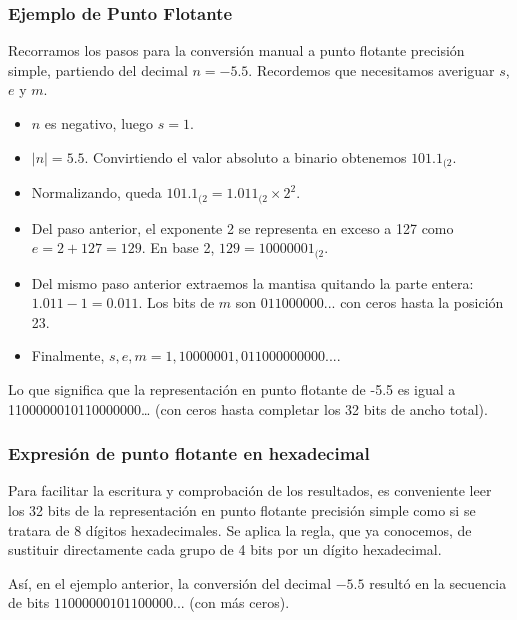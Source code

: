 \documentclass[spanish,a4paper,]{article}
\providecommand{\tightlist}{%
  \setlength{\itemsep}{0pt}\setlength{\parskip}{0pt}}
\begin{document}
\hypertarget{ejemplo-de-punto-flotante}{%
\subsubsection{Ejemplo de Punto
Flotante}\label{ejemplo-de-punto-flotante}}

Recorramos los pasos para la conversión manual a punto flotante
precisión simple, partiendo del decimal \(n = -5.5\). Recordemos que
necesitamos averiguar \(s\), \(e\) y \(m\).

\begin{itemize}
\tightlist
\item
  \(n\) es negativo, luego \(s = 1\).
\item
  \(|n| = 5.5\). Convirtiendo el valor absoluto a binario obtenemos
  \(101.1_{(2}\).
\item
  Normalizando, queda \(101.1_{(2} = 1.011_{(2}\times 2^2\).
\item
  Del paso anterior, el exponente 2 se representa en exceso a 127 como
  \(e = 2 + 127 = 129\). En base 2, \(129 = 10000001_{(2}\).
\item
  Del mismo paso anterior extraemos la mantisa quitando la parte entera:
  \(1.011 - 1 = 0.011\). Los bits de \(m\) son \(011000000...\) con
  ceros hasta la posición 23.
\item
  Finalmente, \(s, e, m = 1, 10000001, 011000000000...\).
\end{itemize}

Lo que significa que la representación en punto flotante de -5.5 es
igual a 1100000010110000000\ldots{} (con ceros hasta completar los 32
bits de ancho total).

\hypertarget{expresiuxf3n-de-punto-flotante-en-hexadecimal}{%
\subsubsection{Expresión de punto flotante en
hexadecimal}\label{expresiuxf3n-de-punto-flotante-en-hexadecimal}}

Para facilitar la escritura y comprobación de los resultados, es
conveniente leer los 32 bits de la representación en punto flotante
precisión simple como si se tratara de 8 dígitos hexadecimales. Se
aplica la regla, que ya conocemos, de sustituir directamente cada grupo
de 4 bits por un dígito hexadecimal.

Así, en el ejemplo anterior, la conversión del decimal \(-5.5\) resultó
en la secuencia de bits \(11000000101100000...\) (con más ceros).
\end{document}
